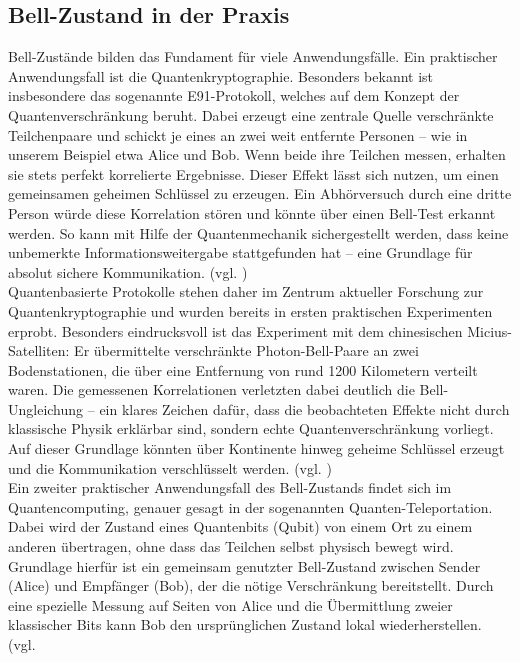 \subsection{Bell-Zustand in der Praxis}

Bell-Zustände bilden das Fundament für viele Anwendungsfälle. Ein praktischer Anwendungsfall ist die Quantenkryptographie. Besonders bekannt ist insbesondere das sogenannte E91-Protokoll, welches auf dem Konzept der Quantenverschränkung beruht. Dabei erzeugt eine zentrale Quelle verschränkte Teilchenpaare und schickt je eines an zwei weit entfernte Personen – wie in unserem Beispiel etwa Alice und Bob. Wenn beide ihre Teilchen messen, erhalten sie stets perfekt korrelierte Ergebnisse. Dieser Effekt lässt sich nutzen, um einen gemeinsamen geheimen Schlüssel zu erzeugen. Ein Abhörversuch durch eine dritte Person würde diese Korrelation stören und könnte über einen Bell-Test erkannt werden. So kann mit Hilfe der Quantenmechanik sichergestellt werden, dass keine unbemerkte Informationsweitergabe stattgefunden hat – eine Grundlage für absolut sichere Kommunikation. (vgl. \cite[S. 3841 f.]{state-of-the-art-survey})
\\


Quantenbasierte Protokolle stehen daher im Zentrum aktueller Forschung zur Quantenkryptographie und wurden bereits in ersten praktischen Experimenten erprobt. Besonders eindrucksvoll ist das Experiment mit dem chinesischen Micius-Satelliten: Er übermittelte verschränkte Photon-Bell-Paare an zwei Bodenstationen, die über eine Entfernung von rund 1200 Kilometern verteilt waren. Die gemessenen Korrelationen verletzten dabei deutlich die Bell-Ungleichung – ein klares Zeichen dafür, dass die beobachteten Effekte nicht durch klassische Physik erklärbar sind, sondern echte Quantenverschränkung vorliegt. Auf dieser Grundlage könnten über Kontinente hinweg geheime Schlüssel erzeugt und die Kommunikation verschlüsselt werden. (vgl. \cite{Entanglement Distribution})
\\


Ein zweiter praktischer Anwendungsfall des Bell-Zustands findet sich im Quantencomputing, genauer gesagt in der sogenannten Quanten-Teleportation. Dabei wird der Zustand eines Quantenbits (Qubit) von einem Ort zu einem anderen übertragen, ohne dass das Teilchen selbst physisch bewegt wird. Grundlage hierfür ist ein gemeinsam genutzter Bell-Zustand zwischen Sender (Alice) und Empfänger (Bob), der die nötige Verschränkung bereitstellt. Durch eine spezielle Messung auf Seiten von Alice und die Übermittlung zweier klassischer Bits kann Bob den ursprünglichen Zustand lokal wiederherstellen. (vgl. \cite{Teleporting}
\\


